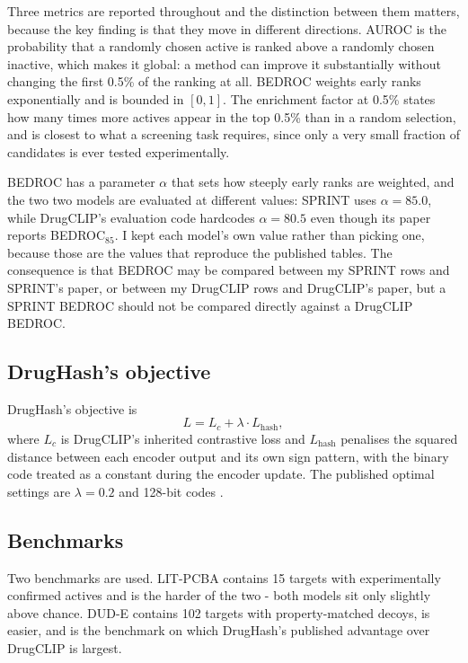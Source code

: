 \documentclass[10pt,a4paper]{article}
\begin{document}
Three metrics are reported throughout and the distinction between them matters, because the
key finding is that they move in different directions. AUROC is the probability that a
randomly chosen active is ranked above a randomly chosen inactive, which makes it global: a
method can improve it substantially without changing the first 0.5\% of the ranking at all.
BEDROC \citep{bib:bedroc} weights early ranks exponentially and is bounded in $[0,1]$. The enrichment factor at
0.5\% states how many times more actives appear in the top 0.5\% than in a random selection,
and is closest to what a screening task requires, since only a very small fraction of
candidates is ever tested experimentally.

BEDROC has a parameter $\alpha$ that sets how steeply early ranks are weighted, and the two
two models are evaluated at different values: SPRINT uses $\alpha = 85.0$, while DrugCLIP's
evaluation code hardcodes $\alpha = 80.5$ even though its paper reports BEDROC$_{85}$. I kept
each model's own value rather than picking one, because those are the values that reproduce
the published tables. The consequence is that BEDROC may be compared between my SPRINT rows
and SPRINT's paper, or between my DrugCLIP rows and DrugCLIP's paper, but a SPRINT BEDROC
should not be compared directly against a DrugCLIP BEDROC.

\subsection{DrugHash's objective}
DrugHash's objective is
\begin{equation}
L = L_c + \lambda \cdot L_{\text{hash}},
\end{equation}
where $L_c$ is DrugCLIP's inherited contrastive loss and $L_{\text{hash}}$ penalises the
squared distance between each encoder output and its own sign pattern, with the binary code
treated as a constant during the encoder update. The published optimal settings are
$\lambda = 0.2$ and 128-bit codes \citep{bib:drughash}.

\subsection{Benchmarks}
Two benchmarks are used. LIT-PCBA \citep{bib:litpcba} contains 15 targets with experimentally confirmed actives
and is the harder of the two - both models sit only slightly above chance. DUD-E \citep{bib:dude} contains 102
targets with property-matched decoys, is easier, and is the benchmark on which DrugHash's
published advantage over DrugCLIP is largest.
\end{document}
